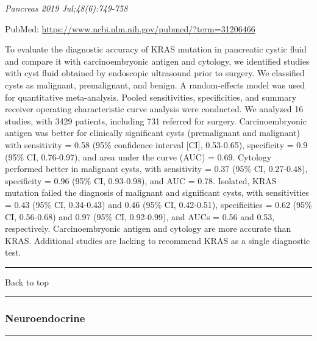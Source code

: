 \documentclass[]{article}
\begin{document}
\emph{Pancreas 2019 Jul;48(6):749-758}

PubMed: \url{https://www.ncbi.nlm.nih.gov/pubmed/?term=31206466}

To evaluate the diagnostic accuracy of KRAS mutation in pancreatic
cystic fluid and compare it with carcinoembryonic antigen and cytology,
we identified studies with cyst fluid obtained by endoscopic ultrasound
prior to surgery. We classified cysts as malignant, premalignant, and
benign. A random-effects model was used for quantitative meta-analysis.
Pooled sensitivities, specificities, and summary receiver operating
characteristic curve analysis were conducted. We analyzed 16 studies,
with 3429 patients, including 731 referred for surgery. Carcinoembryonic
antigen was better for clinically significant cysts (premalignant and
malignant) with sensitivity = 0.58 (95\% confidence interval {[}CI{]},
0.53-0.65), specificity = 0.9 (95\% CI, 0.76-0.97), and area under the
curve (AUC) = 0.69. Cytology performed better in malignant cysts, with
sensitivity = 0.37 (95\% CI, 0.27-0.48), specificity = 0.96 (95\% CI,
0.93-0.98), and AUC = 0.78. Isolated, KRAS mutation failed the diagnosis
of malignant and significant cysts, with sensitivities = 0.43 (95\% CI,
0.34-0.43) and 0.46 (95\% CI, 0.42-0.51), specificities = 0.62 (95\% CI,
0.56-0.68) and 0.97 (95\% CI, 0.92-0.99), and AUCs = 0.56 and 0.53,
respectively. Carcinoembryonic antigen and cytology are more accurate
than KRAS. Additional studies are lacking to recommend KRAS as a single
diagnostic test.

{}

{}

\begin{center}\rule{0.5\linewidth}{\linethickness}\end{center}

Back to top

\begin{center}\rule{0.5\linewidth}{\linethickness}\end{center}

\pagebreak

\hypertarget{neuroendocrine-1}{%
\subsubsection{Neuroendocrine}\label{neuroendocrine-1}}

\begin{center}\rule{0.5\linewidth}{\linethickness}\end{center}
\end{document}
